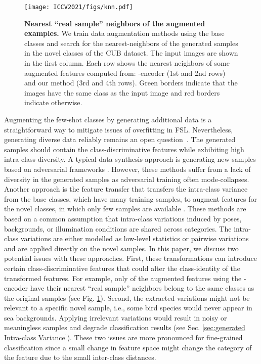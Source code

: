 \documentclass[10pt,twocolumn,letterpaper]{article}
\begin{document}
\begin{figure}
 \texttt{[image: ICCV2021/figs/knn.pdf]}
    \centering
\caption{\textbf{Nearest ``real sample'' neighbors of the augmented examples.} We train data augmentation methods using the base classes and search for the nearest-neighbors of the generated samples in the novel classes of the CUB dataset. The input images are shown in the first column. Each row shows the nearest neighbors of some augmented features computed from: -encoder \cite{delta-encoder} (1st and 2nd rows) and our method (3rd and 4th rows). Green borders indicate that the images have the same class as the input image and red borders indicate otherwise. }
 
    \label{fig:teaser}
\end{figure}


Augmenting the few-shot classes by generating additional data is a straightforward way to mitigate issues of overfitting in FSL. Nevertheless, generating diverse data reliably remains an open question~\cite{Le-etal-ICCV19,appleShrivastavaPTSW16}. 
The generated samples should contain the class-discriminative features while exhibiting high intra-class diversity.
A typical data synthesis approach is generating new samples based on adversarial frameworks \cite{metair_gan, adversarial2020kai, gao2018adversarial, metagan, dagan,Le_2020_ECCV,le2020physicsbased,m_Le-etal-ECCV18}. However, these methods suffer from a lack of diversity in the generated samples as adversarial training often mode-collapses. Another approach is the feature transfer that transfers the intra-class variance from the base classes, which have many training samples, to augment features for the novel classes, in which only few samples are available \cite{delta-encoder, feature_transfer, hallucinate_features}. These methods are based on a common assumption that intra-class variations induced by poses, backgrounds, or illumination conditions are shared across categories.
The intra-class variations are either modelled as low-level statistics \cite{feature_transfer} or pairwise variations \cite{delta-encoder,hallucinate_features} and are applied directly on the novel samples. 
In this paper, we discuss two potential issues with these approaches. First, these transformations can introduce certain class-discriminative features that could alter the class-identity of the transformed features. For example, only  of the augmented features using the -encoder\cite{delta-encoder} have their nearest ``real sample'' neighbors belong to the same classes as the original samples (see Fig. \ref{fig:teaser}). Second, 
the extracted variations might not be relevant to a specific novel sample, i.e., some bird species would never appear in sea backgrounds. Applying irrelevant variations would result in noisy or meaningless samples and degrade  classification results (see Sec. \ref{sec:generated Intra-class Variance}). These two issues are more pronounced for fine-grained classification since a small change in feature space might change the category of the feature due to the small inter-class distances. 
\end{document}
